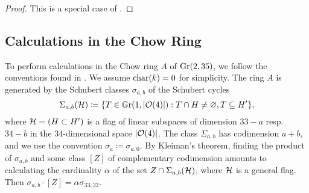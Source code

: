 \begin{proof}
			


This is a special case of .
\end{proof}

\subsection{Calculations in the Chow Ring}

To perform calculations in the Chow ring $A$ of $\operatorname{Gr}(2,35)$, we follow the conventions found in \cite{eisenbud-harris-intersection-theory}. We assume $\operatorname{char}(k) = 0$ for simplicity. The ring $A$ is generated by the Schubert classes $\sigma_{a,b}$ of the Schubert cycles
\[
	\Sigma_{a,b}(\mathcal{H})\coloneqq \{T \in \mathbb G \mathrm r(1,\lvert\mathcal{O}(4)\rvert) : T \cap H \neq \varnothing, T \subseteq H'\},
\]
where $\mathcal{H} = (H\subset H')$ is a flag of linear subspaces of dimension $33-a$ resp.\ $34-b$ in the $34$-dimensional space $\lvert\mathcal{O}(4)\rvert$. The class $\Sigma_{a,b}$ has codimension $a+b$, and we use the convention $\sigma_{a}\coloneqq \sigma_{a,0}$. By Kleiman's theorem, finding the product of $\sigma_{a,b}$ and some class $[Z]$ of complementary codimension amounts to calculating the cardinality $\alpha$ of the set $Z\cap \Sigma_{a,b}(\mathcal{H})$, where $\mathcal{H}$ is a general flag. Then $\sigma_{a,b} \cdot [Z] = \alpha \sigma_{33,33}$.

